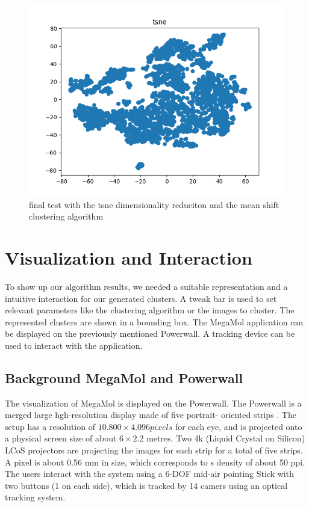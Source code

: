 \documentclass[journal]{vgtc}       %
\begin{document}
\begin{figure}[tb]
	\begin{center}
		\includegraphics[width=.75\linewidth]{tsneFull.png}
	\end{center}
	\caption{\label{fig:tsnef} final test with the tsne dimensionality reduciton and the mean shift clustering algorithm }
\end{figure}

\section{Visualization and Interaction}

To show up our algorithm results, we needed a suitable representation and a intuitive interaction for our generated clusters. A tweak bar is used to   set relevant parameters like the clustering algorithm or the images to cluster.  The represented clusters are shown in a bounding box. The MegaMol application can be displayed on the previously mentioned Powerwall. A tracking device can be used to interact with the application.

\subsection{Background MegaMol and Powerwall}


The visualization of MegaMol is displayed on the Powerwall.
The  Powerwall is a merged large hgh-resolution display made of five portrait- oriented
strips . The setup has  a resolution of $10.800 \times 4.096 pixels$
for each eye, and is projected onto a physical screen size of about $6 \times 2.2$ metres. 
Two 4k (Liquid Crystal on Silicon) LCoS projectors are projecting the images for each strip for a total of five strips.
A pixel is about 0.56 mm  in size, which corresponds to s density of about 50 ppi.
The users interact with the system using a 6-DOF mid-air
pointing Stick with two buttons (1 on each side), which is tracked by 14 camers
using an optical tracking system. 
\end{document}
